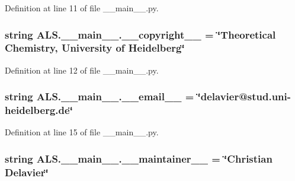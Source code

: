 Definition at line 11 of file \+\_\+\+\_\+main\+\_\+\+\_\+.\+py.

\hypertarget{namespace_a_l_s_1_1____main_____aa789b32fba45101c1352cea971ff935e}{
\subsubsection[{\+\_\+\+\_\+copyright\+\_\+\+\_\+}]{\setlength{\rightskip}{0pt plus 5cm}string A\+L\+S.\+\_\+\+\_\+main\+\_\+\+\_\+.\+\_\+\+\_\+copyright\+\_\+\+\_\+ = \char`\"{}Theoretical Chemistry, University of Heidelberg\char`\"{}}}\label{namespace_a_l_s_1_1____main_____aa789b32fba45101c1352cea971ff935e}


Definition at line 12 of file \+\_\+\+\_\+main\+\_\+\+\_\+.\+py.

\hypertarget{namespace_a_l_s_1_1____main_____a0251675f23b74ea7707de3d1e69ce70f}{
\subsubsection[{\+\_\+\+\_\+email\+\_\+\+\_\+}]{\setlength{\rightskip}{0pt plus 5cm}string A\+L\+S.\+\_\+\+\_\+main\+\_\+\+\_\+.\+\_\+\+\_\+email\+\_\+\+\_\+ = \char`\"{}delavier@stud.\+uni-\/heidelberg.\+de\char`\"{}}}\label{namespace_a_l_s_1_1____main_____a0251675f23b74ea7707de3d1e69ce70f}


Definition at line 15 of file \+\_\+\+\_\+main\+\_\+\+\_\+.\+py.

\hypertarget{namespace_a_l_s_1_1____main_____a5d02f90371afbc284e67f8b7627522bb}{
\subsubsection[{\+\_\+\+\_\+maintainer\+\_\+\+\_\+}]{\setlength{\rightskip}{0pt plus 5cm}string A\+L\+S.\+\_\+\+\_\+main\+\_\+\+\_\+.\+\_\+\+\_\+maintainer\+\_\+\+\_\+ = \char`\"{}Christian Delavier\char`\"{}}}\label{namespace_a_l_s_1_1____main_____a5d02f90371afbc284e67f8b7627522bb}


